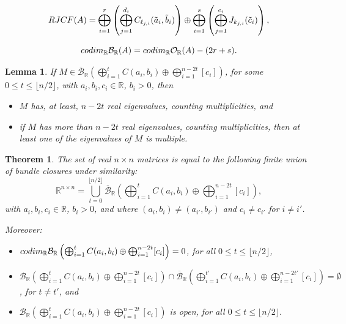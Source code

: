 \documentclass[10pt,a4paper]{amsart}
\newtheorem{lemma}{Lemma}
\newtheorem{theorem}{Theorem}
\newcommand{\R}{\mathbb R}
\newcommand{\bunr}{{\mathcal B}_{\R}}
\newcommand{\cbunr}{{\overline{\mathcal B}}_{\R}}
\newcommand{\cod}{{\rm codim}_\R}
\newcommand{\orbr}{{\mathcal O}_{\R}}
\begin{document}
\begin{equation}\label{rjcf}
    {\rm RJCF}(A)=\bigoplus_{i=1}^r\left(\bigoplus_{j=1}^{d_i}C_{\ell_{j,i}}(\tilde a_i, \tilde b_i)\right)\oplus\bigoplus_{i=1}^s\left(\bigoplus_{j=1}^{e_i} J_{k_{j,i}}(\tilde c_i)\right),
\end{equation}

\begin{equation} \label{eq.codimbund}
\cod\bunr(A)=\cod\orbr(A)-(2r+s).
\end{equation}

\begin{lemma}\label{nrealevals.lemma}
 If $M\in\cbunr \left(\bigoplus_{i=1}^tC(a_i,b_i)\oplus\bigoplus_{i=1}^{n-2t}[c_i]\right)$, for some $0\leq t\leq\lfloor n/2\rfloor$, with $a_i, b_i, c_i\in\R$, $ b_i >0$, then
 \begin{itemize}
     \item[\rm (a)]$M$ has, at least, $n-2t$ real eigenvalues, counting multiplicities, and
     \item[\rm(b)] if $M$ has more than $n-2t$ real eigenvalues, counting multiplicities, then at least one of the eigenvalues of $M$ is multiple.
 \end{itemize}
\end{lemma}

\begin{theorem}\label{main.th}
    The set of real $n\times n$ matrices is equal to the following finite union of bundle closures under similarity:
    \begin{equation}\label{mainid}
    \R^{n\times n}=\bigcup_{t=0}^{\lfloor n/2\rfloor}\cbunr \left(\bigoplus_{i=1}^tC(a_i,b_i)\oplus\bigoplus_{i=1}^{n-2t}[c_i]\right),
    \end{equation}
    with $a_i,b_i,c_i\in\R$, $b_i >0$, and where $(a_i,b_i) \neq (a_{i'}, b_{i'})$ and $c_i\neq c_{i'}$ for $i\neq i'$.

    Moreover:
    \begin{itemize}
        \item[\rm(i)] $\cod\bunr \left(\bigoplus_{i=1}^tC(a_i,b_i)\oplus\bigoplus_{i=1}^{n-2t}[c_i]\right)=0$, for all $0\leq t\leq \lfloor n/2\rfloor$,
        \item[\rm(ii)]  $\bunr \left(\bigoplus_{i=1}^tC(a_i,b_i)\oplus\bigoplus_{i=1}^{n-2t}[c_i]\right)\cap\cbunr \left(\bigoplus_{i=1}^{t'}C(a_i,b_i)\oplus\bigoplus_{i=1}^{n-2t'}[c_i]\right)=\emptyset$, for $t\neq t'$, and
        \item[\rm(iii)] $\bunr \left(\bigoplus_{i=1}^tC(a_i,b_i)\oplus\bigoplus_{i=1}^{n-2t}[c_i]\right)$ is open, for all $0\leq t\leq\lfloor n/2\rfloor$.
    \end{itemize}
\end{theorem}
\end{document}
